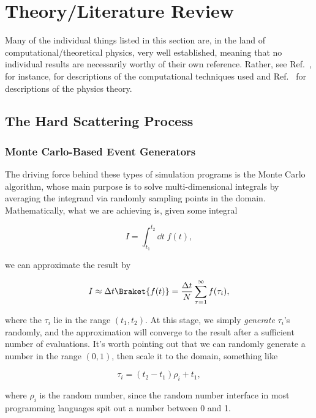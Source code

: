 \section{Theory/Literature Review}\label{sec:2-theory}

Many of the individual things listed in this section are, in the land of computational/theoretical physics, very well established, meaning that no individual results are necessarily worthy of their own reference. Rather, see Ref.~\cite{Press_2007}, for instance, for descriptions of the computational techniques used and Ref.~\cite{peskin-schroeder} for descriptions of the physics theory.

\subsection{The Hard Scattering Process}

\subsubsection{Monte Carlo-Based Event Generators}

The driving force behind these types of simulation programs is the Monte Carlo algorithm, whose main purpose is to solve multi-dimensional integrals by averaging the integrand via randomly sampling points in the domain. Mathematically, what we are achieving is, given some integral

\begin{equation}
  I = \int_{t_1}^{t_2} \dd t \; f(t),
\end{equation}

we can approximate the result by

\begin{equation}
  I \approx \Delta t \Braket{f(t)} = \frac{\Delta t}{N} \sum_{\tau=1}^{\infty} f(\tau_i),
\end{equation}

where the $\tau_i$ lie in the range $(t_1,t_2)$. At this stage, we simply \textit{generate} $\tau_i$'s randomly, and the approximation will converge to the result after a sufficient number of evaluations. It's worth pointing out that we can randomly generate a number in the range $(0,1)$, then scale it to the domain, something like

\begin{equation}
  \tau_i = (t_2 - t_1)\rho_i + t_1,
\end{equation}

where $\rho_i$ is the random number, since the random number interface in most programming languages spit out a number between 0 and 1.

